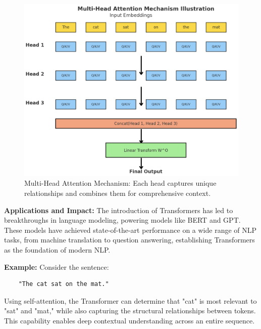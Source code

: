 \begin{flushleft}
    \begin{figure}[H]
        \centering
        \includegraphics[width=\linewidth]{lm/multi_head_attention_example.png}
        \caption{Multi-Head Attention Mechanism: Each head captures unique relationships and combines them for comprehensive context.}
        \label{fig:multi_head_attention_example}
    \end{figure}

    \textbf{Applications and Impact:} The introduction of Transformers has led to breakthroughs in language modeling, powering models like BERT and GPT. These models have achieved state-of-the-art performance on a wide range of NLP tasks, from machine translation to question answering, establishing Transformers as the foundation of modern NLP. \break

    \textbf{Example:}
    Consider the sentence:
    \begin{verbatim}
    "The cat sat on the mat."
    \end{verbatim}
    Using self-attention, the Transformer can determine that "cat" is most relevant to "sat" and "mat," while also capturing the structural relationships between tokens. This capability enables deep contextual understanding across an entire sequence.
\end{flushleft}


